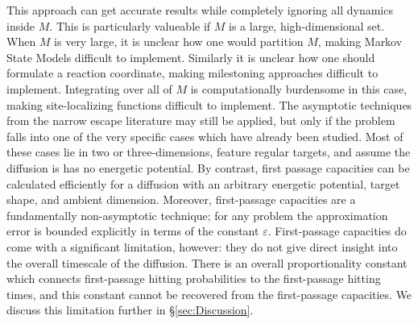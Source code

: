 \documentclass[12pt, nofootinbib,english, amsmath, amssymb, aps, priprint, graphicx,floatfix]{revtex4-1}
\theoremstyle{plain}
\theoremstyle{definition}
\theoremstyle{plain}
\begin{document}
This approach can get accurate results while completely ignoring all dynamics inside $M$.  This is particularly valueable if $M$ is a large, high-dimensional set.  When $M$ is very large, it is unclear how one would partition $M$, making Markov State Models difficult to implement.  Similarly it is unclear how one should formulate a reaction coordinate, making milestoning approaches difficult to implement.  Integrating over all of $M$ is computationally burdensome in this case, making site-localizing functions difficult to implement.  The asymptotic techniques from the narrow escape literature may still be applied, but only if the problem falls into one of the very specific cases which have already been studied.  Most of these cases lie in two or three-dimensions, feature regular targets, and assume the diffusion is has no energetic potential.  By contrast, first passage capacities can be calculated efficiently for a diffusion with an arbitrary energetic potential, target shape, and ambient dimension.  Moreover, first-passage capacities are a fundamentally non-asymptotic technique; for any problem the approximation error is bounded explicitly in terms of the constant $\varepsilon$.   First-passage capacities do come with a significant limitation, however: they do not give direct insight into the overall timescale of the diffusion. There is an overall proportionality constant which connects first-passage hitting probabilities to the first-passage hitting times, and this constant cannot be recovered from the first-passage capacities.  We discuss this limitation further in \S\ref{sec:Discussion}.  
\end{document}

